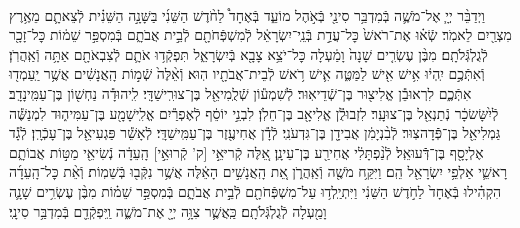 \documentclass[twoside, openany, parskip=half, 11pt]{book}
\begin{document}
\begin{sometimes}
\begin{footnotesize}
\begin{multicols}{2}
\\
וַיְדַבֵּ֨ר יְיָ֧ אֶל־מֹשֶׁ֛ה בְּֿמִדְבַּ֥ר סִינַ֖י בְּֿאֹ֣הֶל מוֹעֵ֑ד בְּֿאֶחָד֩ לַחֹ֨דֶשׁ הַשֵּׁנִ֜י בַּשָּׁנָ֣ה הַשֵּׁנִ֗ית לְֿצֵאתָ֛ם מֵאֶ֥רֶץ מִצְרַ֖יִם לֵאמֹֽר׃ שְֿׂא֗וּ אֶת־רֹאשׁ֙ כׇּל־עֲדַ֣ת בְּֿנֵֽי־יִשְׂרָאֵ֔ל לְֿמִשְׁפְּֿחֹתָ֖ם לְֿבֵ֣ית אֲבֹתָ֑ם בְּֿמִסְפַּ֣ר שֵׁמ֔וֹת כׇּל־זָכָ֖ר לְֿגֻלְגְּֿלֹתָֽם׃ מִבֶּ֨ן עֶשְׂרִ֤ים שָׁנָה֙ וָמַ֔עְלָה כׇּל־יֹצֵ֥א צָבָ֖א בְּֿיִשְׂרָאֵ֑ל תִּפְקְֿד֥וּ אֹתָ֛ם לְֿצִבְאֹתָ֖ם אַתָּ֥ה וְֿאַֽהֲרֹֽן׃ וְֿאִתְּֿכֶ֣ם יִֽהְי֔וּ אִ֥ישׁ אִ֖ישׁ לַמַּטֶּ֑ה אִ֛ישׁ רֹ֥אשׁ לְֿבֵית־אֲבֹתָ֖יו הֽוּא׃  וְֿאֵ֨לֶּה֙ שְֿׁמ֣וֹת הָֽאֲנָשִׁ֔ים אֲשֶׁ֥ר יַֽעַמְד֖וּ אִתְּֿכֶ֑ם לִרְאוּבֵ֕ן אֱלִיצ֖וּר בֶּן־שְֿׁדֵיאֽוּר׃ לְֿשִׁמְע֕וֹן שְֿׁלֻֽמִיאֵ֖ל בֶּן־צוּרִֽישַׁדָּֽי׃ לִֽיהוּדָ֕ה נַחְשׁ֖וֹן בֶּן־עַמִּֽינָדָֽב׃ לְֿיִ֨שָּׂשׂכָ֔ר נְֿתַנְאֵ֖ל בֶּן־צוּעָֽר׃ לִזְבוּלֻ֕ן אֱלִיאָ֖ב בֶּן־חֵלֹֽן׃ לִבְנֵ֣י יוֹסֵ֔ף לְֿאֶפְרַ֕יִם אֱלִֽישָׁמָ֖ע בֶּן־עַמִּיה֑וּד לִמְנַשֶּׁ֕ה גַּמְלִיאֵ֖ל בֶּן־פְּֿֿדָהצֽוּר׃ לְֿבִ֨נְיָמִ֔ן אֲבִידָ֖ן בֶּן־גִּדְעֹנִֽי׃ לְֿדָ֕ן אֲחִיעֶ֖זֶר בֶּן־עַמִּֽישַׁדָּֽי׃ לְֿאָשֵׁ֕ר פַּגְעִיאֵ֖ל בֶּן־עָכְֿרָֽן׃ לְֿגָ֕ד אֶלְיָסָ֖ף בֶּן־דְּֿֿעוּאֵֽל׃ לְֿנַ֨פְתָּלִ֔י אֲחִירַ֖ע בֶּן־עֵינָֽן׃ אֵ֚לֶּה קְֿריּאֵ֣י [ק' קְֿרוּאֵ֣י] הָֽעֵדָ֔ה נְֿשִׂיאֵ֖י מַטּ֣וֹת אֲבוֹתָ֑ם רָאשֵׁ֛י אַלְפֵ֥י יִשְׂרָאֵ֖ל הֵֽם׃  וַיִּקַּ֥ח מֹשֶׁ֖ה וְֿאַֽהֲרֹ֑ן אֵ֚ת הָֽאֲנָשִׁ֣ים הָאֵ֔לֶּה אֲשֶׁ֥ר נִקְּֿב֖וּ בְּֿשֵׁמֽוֹת׃ וְֿאֵ֨ת כׇּל־הָֽעֵדָ֜ה הִקְהִ֗ילוּ בְּֿאֶחָד֙ לַחֹ֣דֶשׁ הַשֵּׁנִ֔י וַיִּתְיַֽלְד֥וּ עַל־מִשְׁפְּֿחֹתָ֖ם לְֿבֵ֣ית אֲבֹתָ֑ם בְּֿמִסְפַּ֣ר שֵׁמ֗וֹת מִבֶּ֨ן עֶשְׂרִ֥ים שָׁנָ֛ה וָמַ֖עְלָה לְֿגֻלְגְּֿלֹתָֽם׃ כַּֽאֲשֶׁ֛ר צִוָּ֥ה יְיָ֖ אֶת־מֹשֶׁ֑ה וַֽיִּפְקְֿדֵ֖ם בְּֿמִדְבַּ֥ר סִינָֽי׃


\end{multicols}
\end{footnotesize}
\end{sometimes}
\end{document}
